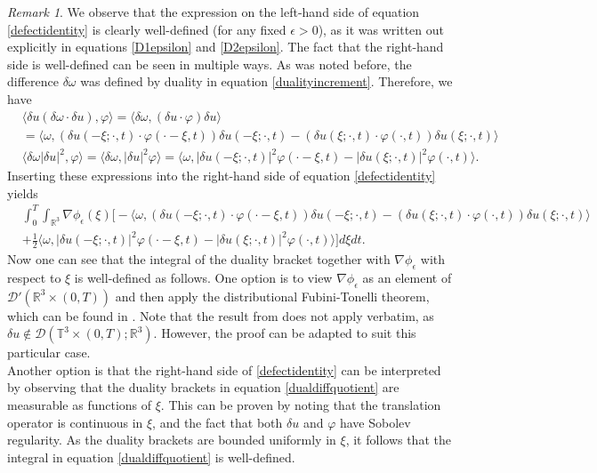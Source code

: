 \documentclass[12pt,a4paper]{article}
\theoremstyle{definition}
\theoremstyle{remark}
\newtheorem{remark}[theorem]{Remark}
\numberwithin{equation}{section}
\begin{document}
\begin{remark} \label{defectidentityremark}
We observe that the expression on the left-hand side of equation \eqref{defectidentity} is clearly well-defined (for any fixed $\epsilon > 0$), as it was written out explicitly in equations \eqref{D1epsilon} and \eqref{D2epsilon}. The fact that the right-hand side is well-defined can be seen in multiple ways. As was noted before, the difference $\delta \omega$ was defined by duality in equation \eqref{dualityincrement}. Therefore, we have
\begin{align*}
&\langle \delta u (\delta \omega \cdot \delta u), \varphi \rangle = \langle \delta \omega, (\delta u \cdot \varphi) \delta u \rangle \\
&= \bigg\langle \omega, (\delta u (-\xi ; \cdot , t) \cdot \varphi (\cdot - \xi, t)) \delta u (-\xi ; \cdot , t) - (\delta u (\xi ; \cdot, t) \cdot \varphi (\cdot, t)) \delta u (\xi ; \cdot, t) \bigg\rangle \\
&\langle \delta \omega \lvert \delta u \rvert^2 , \varphi \rangle = \langle \delta \omega , \lvert \delta u \rvert^2 \varphi \rangle = \bigg\langle \omega, \lvert \delta u (-\xi ; \cdot, t) \rvert^2 \varphi (\cdot - \xi , t) - \lvert \delta u ( \xi ; \cdot, t) \rvert^2 \varphi (\cdot, t) \bigg\rangle.
\end{align*}
Inserting these expressions into the right-hand side of equation \eqref{defectidentity} yields
\begin{align}
&\int_0^T \int_{\mathbb{R}^3} \nabla \phi_\epsilon (\xi) \bigg[- \bigg\langle \omega, (\delta u (-\xi ; \cdot , t) \cdot \varphi (\cdot - \xi, t)) \delta u (-\xi ; \cdot , t) - (\delta u (\xi ; \cdot, t) \cdot \varphi (\cdot, t)) \delta u (\xi ; \cdot, t) \bigg\rangle \nonumber \\
&+ \frac{1}{2} \bigg\langle \omega, \lvert \delta u (-\xi ; \cdot, t) \rvert^2 \varphi (\cdot - \xi , t) - \lvert \delta u ( \xi ; \cdot, t) \rvert^2 \varphi (\cdot, t) \bigg\rangle \bigg] d \xi dt. \label{dualdiffquotient}
\end{align}
Now one can see that the integral of the duality bracket together with $\nabla \phi_\epsilon$ with respect to $\xi$ is well-defined as follows. One option is to view $\nabla \phi_\epsilon$ as an element of $\mathcal{D}' (\mathbb{R}^3 \times (0,T))$ and then apply the distributional Fubini-Tonelli theorem, which can be found in \cite[~Theorem IV, Section 3, Chapter IV]{schwartz}. Note that the result from \cite{schwartz} does not apply verbatim, as $\delta u \notin \mathcal{D} (\mathbb{T}^3 \times (0,T); \mathbb{R}^3)$. However, the proof can be adapted to suit this particular case. \\
Another option is that the right-hand side of \eqref{defectidentity} can be interpreted by observing that the duality brackets in equation \eqref{dualdiffquotient} are measurable as functions of $\xi$. This can be proven by noting that the translation operator is continuous in $\xi$, and the fact that both $\delta u$ and $\varphi$ have Sobolev regularity. As the duality brackets are bounded uniformly in $\xi$, it follows that the integral in equation \eqref{dualdiffquotient} is well-defined.
\end{remark}
\end{document}
